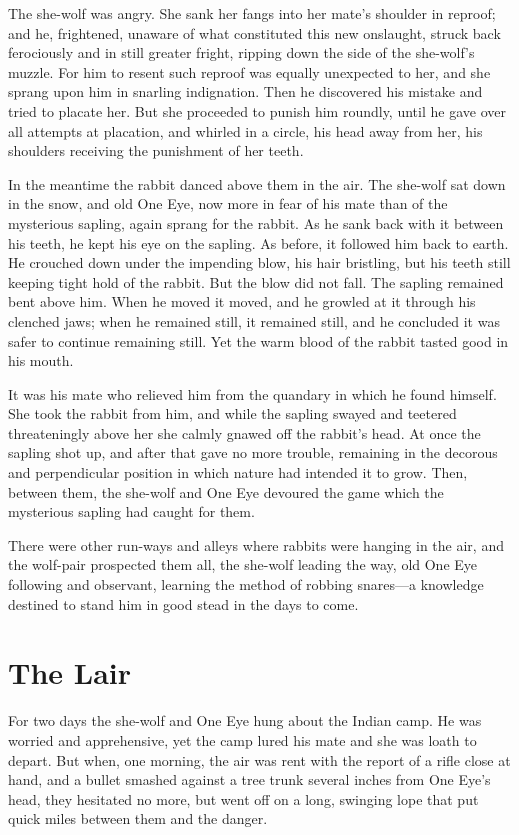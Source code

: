 \documentclass[10pt]{book}
\begin{document}
The she-wolf was angry. She sank her fangs into her mate’s shoulder in
reproof; and he, frightened, unaware of what constituted this new
onslaught, struck back ferociously and in still greater fright, ripping
down the side of the she-wolf’s muzzle. For him to resent such reproof
was equally unexpected to her, and she sprang upon him in snarling
indignation. Then he discovered his mistake and tried to placate her.
But she proceeded to punish him roundly, until he gave over all
attempts at placation, and whirled in a circle, his head away from her,
his shoulders receiving the punishment of her teeth.

In the meantime the rabbit danced above them in the air. The she-wolf
sat down in the snow, and old One Eye, now more in fear of his mate
than of the mysterious sapling, again sprang for the rabbit. As he sank
back with it between his teeth, he kept his eye on the sapling. As
before, it followed him back to earth. He crouched down under the
impending blow, his hair bristling, but his teeth still keeping tight
hold of the rabbit. But the blow did not fall. The sapling remained
bent above him. When he moved it moved, and he growled at it through
his clenched jaws; when he remained still, it remained still, and he
concluded it was safer to continue remaining still. Yet the warm blood
of the rabbit tasted good in his mouth.

It was his mate who relieved him from the quandary in which he found
himself. She took the rabbit from him, and while the sapling swayed and
teetered threateningly above her she calmly gnawed off the rabbit’s
head. At once the sapling shot up, and after that gave no more trouble,
remaining in the decorous and perpendicular position in which nature
had intended it to grow. Then, between them, the she-wolf and One Eye
devoured the game which the mysterious sapling had caught for them.

There were other run-ways and alleys where rabbits were hanging in the
air, and the wolf-pair prospected them all, the she-wolf leading the
way, old One Eye following and observant, learning the method of
robbing snares—a knowledge destined to stand him in good stead in the
days to come.

\chapter{The Lair}

For two days the she-wolf and One Eye hung about the Indian camp. He
was worried and apprehensive, yet the camp lured his mate and she was
loath to depart. But when, one morning, the air was rent with the
report of a rifle close at hand, and a bullet smashed against a tree
trunk several inches from One Eye’s head, they hesitated no more, but
went off on a long, swinging lope that put quick miles between them and
the danger.
\end{document}
